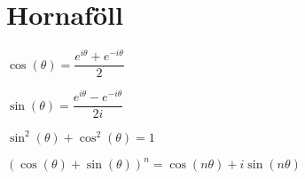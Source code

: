 \noindent
\section*{Hornaföll}


\begin{minipage}{.5\linewidth}
  $\cos(\theta) = \dfrac{e^{i \theta}+e^{-i\theta}}{2}$
\end{minipage}%
\begin{minipage}{.5\linewidth}
	$\sin(\theta) = \dfrac{e^{i \theta}-e^{-i\theta}}{2i}$
\end{minipage}

\begin{minipage}{.5\linewidth}
  $\sin^2(\theta) + \cos^2(\theta) =1$
\end{minipage}%
\begin{minipage}{.5\linewidth}
	$(\cos(\theta)+\sin(\theta))^n = \cos(n\theta)+i\sin(n\theta)$
\end{minipage}


